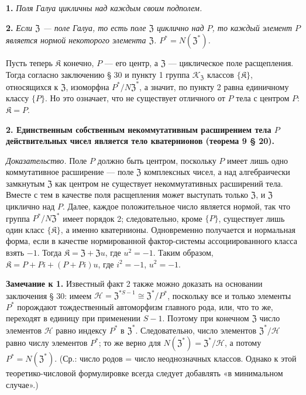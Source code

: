 \documentclass[11pt]{article}
\begin{document}
\noindent\textbf{1.} \emph{Поля Галуа цикличны над каждым своим подполем.}

\noindent\textbf{2.} \emph{Если \(\mathfrak Z\) --- поле Галуа, то есть поле \(\mathfrak Z\) циклично над \(P\), то каждый элемент \(P\) является нормой некоторого элемента \(\mathfrak Z\). \(P^*=N(\mathfrak Z^*)\).}

Пусть теперь \(\mathfrak K\) конечно, \(P\) --- его центр, а \(\mathfrak Z\) --- циклическое поле расщепления. Тогда согласно заключению § 30 и пункту 1 группа \(\mathscr K_{\mathfrak Z}\) классов \(\{\mathfrak K\}\), относящихся к \(\mathfrak Z\), изоморфна \(P^*/N\mathfrak Z^*\), а значит, по пункту 2 равна единичному классу \(\{P\}\). Но это означает, что не существует отличного от \(P\) тела с центром \(P\): \(\mathfrak K=P\).

\noindent\textbf{2. Единственным собственным некоммутативным расширением тела \(P\) действительных чисел является тело кватернионов (теорема 9 § 20).}

\noindent\emph{Доказательство.} Поле \(P\) должно быть центром, поскольку \(P\) имеет лишь одно коммутативное расширение --- поле \(\mathfrak Z\) комплексных чисел, а над алгебраически замкнутым \(\mathfrak Z\) как центром не существует некоммутативных расширений тела. Вместе с тем в качестве поля расщепления может выступать только \(\mathfrak Z\), и \(\mathfrak Z\) циклично над \(P\). Далее, каждое положительное число является нормой, так что группа \(P^*/N\mathfrak Z^*\) имеет порядок 2; следовательно, кроме \(\{P\}\), существует лишь один класс \(\{\mathfrak K\}\), а именно кватернионы. Одновременно получается и нормальная форма, если в качестве нормированной фактор-системы ассоциированного класса взять \(-1\). Тогда \(\mathfrak K=\mathfrak Z+\mathfrak Zu\), где \(u^2=-1\). Таким образом, \(\mathfrak K=P+Pi+(P+Pi)u\), где \(i^2=-1\), \(u^2=-1\).

\noindent\textbf{Замечание к 1.} Известный факт 2 также можно доказать на основании заключения § 30: имеем \(\mathscr H=\mathfrak Z^{*S-1}\cong\mathfrak Z^*/P^*\), поскольку все и только элементы \(P^*\) порождают тождественный автоморфизм главного рода, или, что то же, переходят в единицу при применении \(S-1\). Поэтому при конечном \(\mathfrak Z\) число элементов \(\mathscr H\) равно индексу \(P^*\) в \(\mathfrak Z^*\). Следовательно, число элементов \(\mathfrak Z^*/\mathscr H\) равно числу элементов \(P^*\); то же верно для \(N(\mathfrak Z^*)=\mathfrak Z^*/\mathscr H\), а потому \(P^*=N(\mathfrak Z^*)\). (Ср.: число родов = число неоднозначных классов. Однако к этой теоретико-числовой формулировке всегда следует добавлять «в минимальном случае».)
\end{document}
